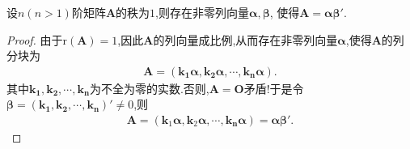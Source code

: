 \documentclass[../../main.tex]{subfiles}%
\begin{document}
\begin{lemma}[秩1矩阵的列向量分解]\label{lemma:秩1矩阵的列向量分解}
设\(n(n > 1)\)阶矩阵\(\boldsymbol{A}\)的秩为\(1\),则存在非零列向量\(\boldsymbol{\alpha},\boldsymbol{\beta}\), 使得\(\boldsymbol{A} = \boldsymbol{\alpha}\boldsymbol{\beta}'\).
\end{lemma}
\begin{proof}
由于$\mathrm{r}(\boldsymbol{A}) = 1$,因此$\boldsymbol{A}$的列向量成比例,从而存在非零列向量$\boldsymbol{\alpha }$,使得$\boldsymbol{A}$的列分块为
\begin{align*}
\boldsymbol{A}=\left( \boldsymbol{k}_{\mathbf{1}}\boldsymbol{\alpha },\boldsymbol{k}_{\mathbf{2}}\boldsymbol{\alpha },\cdots ,\boldsymbol{k}_{\boldsymbol{n}}\boldsymbol{\alpha } \right)  .
\end{align*}
其中$\boldsymbol{k}_{\mathbf{1}},\boldsymbol{k}_{\mathbf{2}},\cdots ,\boldsymbol{k}_{\boldsymbol{n}}$为不全为零的实数.否则,$\boldsymbol{A}=\boldsymbol{O}$矛盾!于是令$\boldsymbol{\beta }=\left( \boldsymbol{k}_{\mathbf{1}},\boldsymbol{k}_{\mathbf{2}},\cdots ,\boldsymbol{k}_{\boldsymbol{n}} \right)'\ne 0$,则
\begin{align*}
\boldsymbol{A}=\left( \boldsymbol{k}_1\boldsymbol{\alpha },\boldsymbol{k}_2\boldsymbol{\alpha },\cdots ,\boldsymbol{k}_{\boldsymbol{n}}\boldsymbol{\alpha } \right) =\boldsymbol{\alpha \beta }' .
\end{align*}
\end{proof}
\end{document}
